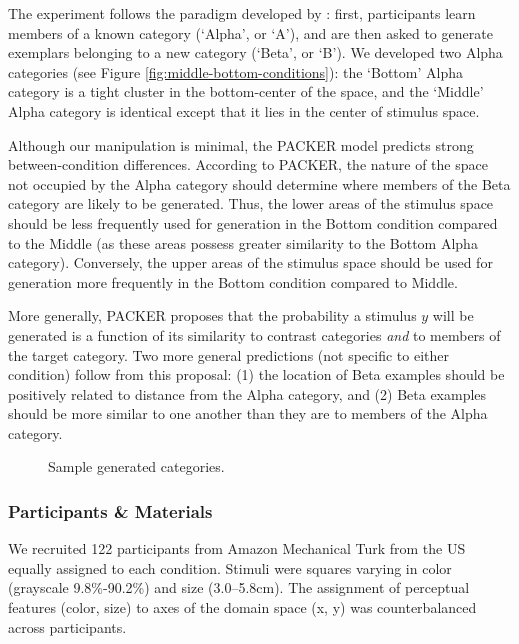 \documentclass[10pt,letterpaper]{article}
\newcommand\inputpgf[2]{{
\let\pgfimageWithoutPath\pgfimage
\renewcommand{\pgfimage}[2][]{\pgfimageWithoutPath[##1]{#1/##2}}

}}
\begin{document}
The experiment follows the paradigm developed by \citet{jern2013probabilistic}: first, participants learn members of a known category (`Alpha', or `A'), and are then asked to generate exemplars belonging to a new category (`Beta', or `B'). We developed two Alpha categories (see Figure \ref{fig:middle-bottom-conditions}): the `Bottom' Alpha category is a tight cluster in the bottom-center of the space, and the `Middle' Alpha category is identical except that it lies in the center of stimulus space.

Although our manipulation is minimal, the PACKER model predicts strong between-condition differences. According to PACKER, the nature of the space not occupied by the Alpha category should determine where members of the Beta category are likely to be generated. Thus, the lower areas of the stimulus space should be less frequently used for generation in the Bottom condition compared to the Middle (as these areas possess greater similarity to the Bottom Alpha category). Conversely, the upper areas of the stimulus space should be used for generation more frequently in the Bottom condition compared to Middle.


More generally, PACKER proposes that the probability a stimulus $y$ will be generated is a function of its similarity to contrast categories \textit{and} to members of the target category. Two more general predictions (not specific to either condition) follow from this proposal: (1) the location of Beta examples should be positively related to distance from the Alpha category, and (2) Beta examples should be more similar to one another than they are to members of the Alpha category.

\begin{figure}
    \begin{center}
    \inputpgf{figs/}{beta.samples.pgf}
    \caption{Sample generated categories. }
    \label{fig:beta.samples}
    \end{center}
\end{figure}

\subsubsection{Participants \& Materials}
We recruited 122 participants from Amazon Mechanical Turk from the US equally assigned to each condition. Stimuli were squares varying in color (grayscale 9.8\%-90.2\%) and size (3.0--5.8cm). The assignment of perceptual features (color, size) to axes of the domain space (x, y) was counterbalanced across participants.
\end{document}
